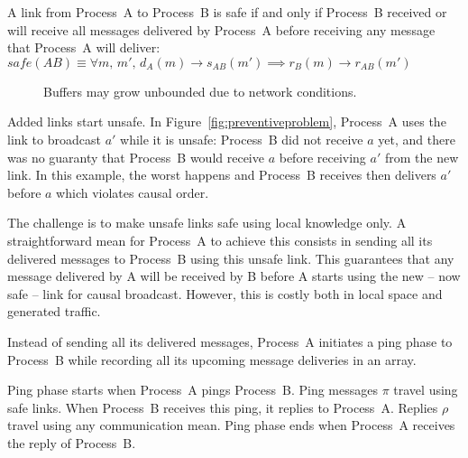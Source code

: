 \begin{definition}
  A link from Process~A to Process~B is safe if and only if Process~B received
  or will receive all messages delivered by Process~A before receiving any
  message that Process~A will deliver:
  $safe(AB) \equiv \forall m,\, m',\, d_A(m) \rightarrow s_{AB}(m') \implies
  r_B(m) \rightarrow r_{AB}(m')$
\end{definition}

\begin{figure*}
  \begin{center}
    \hspace{20pt}
    \hspace{20pt}
    \caption{\label{fig:bufferproblem}Buffers may grow unbounded due to network
      conditions.}
  \end{center}
\end{figure*}


Added links start unsafe. In Figure~\ref{fig:preventiveproblem}, Process~A uses
the link to broadcast $a'$ while it is unsafe: Process~B did not receive $a$
yet, and there was no guaranty that Process~B would receive $a$ before receiving
$a'$ from the new link. In this example, the worst happens and Process~B
receives then delivers $a'$ before $a$ which violates causal order.

The challenge is to make unsafe links safe using local knowledge only. A
straightforward mean for Process~A to achieve this consists in sending all its
delivered messages to Process~B using this unsafe link. This guarantees that any
message delivered by A will be received by B before A starts using the new --
now safe -- link for causal broadcast. However, this is costly both in local
space and generated traffic.

Instead of sending all its delivered messages, Process~A initiates a ping phase
to Process~B while recording all its upcoming message deliveries in an array.

\begin{definition}
  Ping phase starts when Process~A pings Process~B. Ping messages $\pi$ travel
  using safe links. When Process~B receives this ping, it replies to
  Process~A. Replies $\rho$ travel using any communication mean. Ping phase ends
  when Process~A receives the reply of Process~B.
\end{definition}

